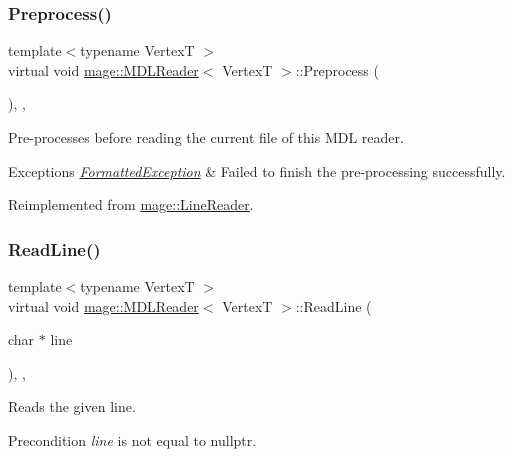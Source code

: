 \subsubsection{\texorpdfstring{Preprocess()}{Preprocess()}}
{\footnotesize\ttfamily template$<$typename VertexT $>$ \\
virtual void \hyperlink{classmage_1_1_m_d_l_reader}{mage\+::\+M\+D\+L\+Reader}$<$ VertexT $>$\+::Preprocess (\begin{DoxyParamCaption}{ }\end{DoxyParamCaption})\hspace{0.3cm}{\ttfamily [override]}, {\ttfamily [private]}, {\ttfamily [virtual]}}

Pre-\/processes before reading the current file of this M\+DL reader.


\begin{DoxyExceptions}{Exceptions}
{\em \hyperlink{classmage_1_1_formatted_exception}{Formatted\+Exception}} & Failed to finish the pre-\/processing successfully. \\
\hline
\end{DoxyExceptions}


Reimplemented from \hyperlink{classmage_1_1_line_reader_a4de135cfb0434be786cfcfd7959031ef}{mage\+::\+Line\+Reader}.

\hypertarget{classmage_1_1_m_d_l_reader_ac50f9cce64621b0a218b6778a611a702}{}\label{classmage_1_1_m_d_l_reader_ac50f9cce64621b0a218b6778a611a702} 
\subsubsection{\texorpdfstring{Read\+Line()}{ReadLine()}}
{\footnotesize\ttfamily template$<$typename VertexT $>$ \\
virtual void \hyperlink{classmage_1_1_m_d_l_reader}{mage\+::\+M\+D\+L\+Reader}$<$ VertexT $>$\+::Read\+Line (\begin{DoxyParamCaption}\item[{char $\ast$}]{line }\end{DoxyParamCaption})\hspace{0.3cm}{\ttfamily [override]}, {\ttfamily [private]}, {\ttfamily [virtual]}}

Reads the given line.

\begin{DoxyPrecond}{Precondition}
{\itshape line} is not equal to {\ttfamily nullptr}. 
\end{DoxyPrecond}

